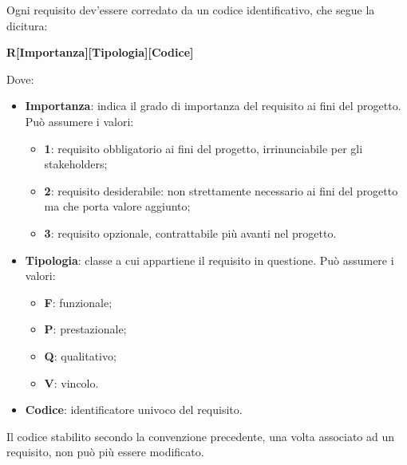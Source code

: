            	\noindent Ogni requisito dev'essere corredato da un codice identificativo, che segue la dicitura: 
			\begin{center}
				\textbf{R[Importanza][Tipologia][Codice]}
			\end{center}
		
			Dove:
			\begin{itemize}
			   	\item{\textbf{Importanza}: indica il grado di importanza del requisito ai fini del progetto. Può assumere i valori:}
			   	\begin{itemize}
			           	\item{\textbf{1}: requisito obbligatorio ai fini del progetto, irrinunciabile per gli stakeholders;}
			           	\item{\textbf{2}: requisito desiderabile: non strettamente necessario ai fini del progetto ma che porta valore aggiunto;}
			           	\item{\textbf{3}: requisito opzionale, contrattabile più avanti nel progetto.}
			   	\end{itemize}
			   	
			   	\item{\textbf{Tipologia}: classe a cui appartiene il requisito in questione. Può assumere i valori:}
			   	\begin{itemize}
			   		\item{\textbf{F}: funzionale;}
			   		\item{\textbf{P}: prestazionale;}
			   		\item{\textbf{Q}: qualitativo;}
			   		\item{\textbf{V}: vincolo.}
			   	\end{itemize}
			   	
			   	\item{\textbf{Codice}: identificatore univoco del requisito}.
			\end{itemize}
         \noindent Il codice stabilito secondo la convenzione precedente, una volta associato ad un requisito, non può più essere modificato. \\

